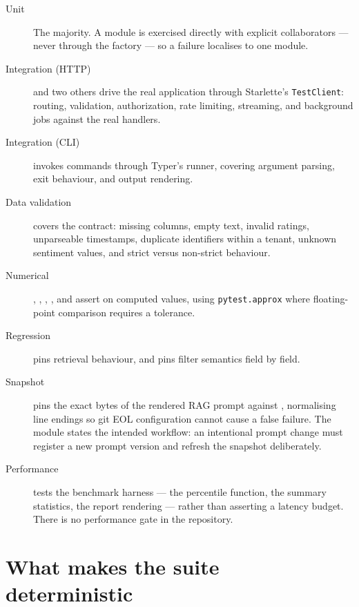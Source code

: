 \begin{description}
  \item[Unit] The majority. A module is exercised directly with explicit
    collaborators --- never through the factory --- so a failure localises to
    one module.
  \item[Integration (HTTP)]  and two others drive
    the real application through Starlette's \texttt{TestClient}: routing,
    validation, authorization, rate limiting, streaming, and background jobs
    against the real handlers.
  \item[Integration (CLI)]  invokes commands
    through Typer's runner, covering argument parsing, exit behaviour, and
    output rendering.
  \item[Data validation]  covers the
    contract: missing columns, empty text, invalid ratings, unparseable
    timestamps, duplicate identifiers within a tenant, unknown sentiment
    values, and strict versus non-strict behaviour.
  \item[Numerical] ,
    , ,
    , and
     assert on computed values, using
    \texttt{pytest.approx} where floating-point comparison requires a
    tolerance.
  \item[Regression]  pins
    retrieval behaviour, and  pins filter
    semantics field by field.
  \item[Snapshot]  pins the exact
    bytes of the rendered RAG prompt against
    , normalising line endings so git EOL
    configuration cannot cause a false failure. The module states the intended
    workflow: an intentional prompt change must register a new prompt version
    and refresh the snapshot deliberately.
  \item[Performance]  tests the benchmark
    harness --- the percentile function, the summary statistics, the report
    rendering --- rather than asserting a latency budget. There is no
    performance gate in the repository.
\end{description}

\section{What makes the suite deterministic}

